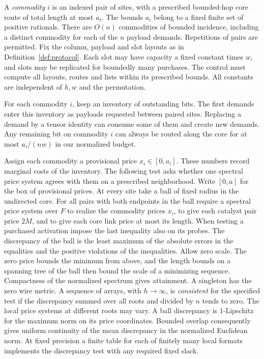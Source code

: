 A \emph{commodity} $i$ is an indexed pair of sites, with a prescribed
bounded-hop core route of total length at most $a_i$. The bounds $a_i$
belong to a fixed finite set of positive rationals. There are $O(n)$
commodities of bounded incidence, including a distinct commodity for
each of the $n$ payload demands. Repetitions of pairs are permitted.
Fix the column, payload and slot layouts as in Definition~\ref{def:protocol}.
Each slot may have capacity a fixed constant times $w$, and slots may be
replicated for boundedly many purchases. The control must compute
all layouts, routes and lists within its prescribed bounds. All constants
are independent of $h,w$ and the permutation.

For each commodity $i$, keep an inventory of outstanding bits. The
first demands enter this inventory as payloads requested between paired
sites. Replacing a
demand by a tensor identity can consume some of them and create new
demands. Any remaining bit on commodity $i$ can always be routed along
the core for at most $a_i/(nw)$ in our normalized budget.

Assign each commodity a provisional price $x_i\in[0,a_i]$. These
numbers record marginal costs of the inventory. The following test
asks whether one spectral price system agrees with them on a prescribed
neighborhood. Write $[0,a]$ for the box of provisional prices.
At every site take a ball of fixed radius in the undirected core.
For all pairs with both endpoints in the ball require a spectral price
system over $F$ to realize the commodity prices $x_i$, to give each
catalyst pair price $2M$, and to give each core link price at most its
length. When testing a purchased activation impose the last inequality
also on its probes. The discrepancy of the ball is the least maximum
of the absolute errors in the equalities and the positive violations of
the inequalities. Allow zero scale. The zero price bounds the minimum
from above, and the length bounds on a spanning tree of the ball then
bound the scale of a minimizing sequence. Compactness of the normalized
spectrum gives attainment. A singleton has the zero wire metric.
A sequence of arrays, with $h\to\infty$, is \emph{consistent} for the
specified test if the discrepancy summed over all roots and divided by
$n$ tends to zero. The local price systems at different roots may vary.
A ball discrepancy is $1$-Lipschitz for the maximum norm on its price
coordinates. Bounded overlap consequently gives uniform continuity of
the mean discrepancy in the normalized Euclidean norm. At fixed
precision a finite table for each of finitely many local formats implements
the discrepancy test with any required fixed slack.

